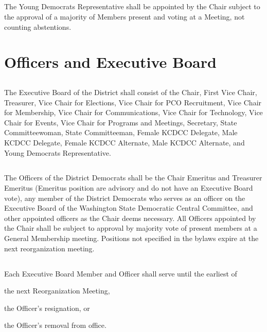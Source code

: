 \subsection{}
The Young Democrats Representative shall be appointed by the Chair subject to the approval of a majority of Members present and voting at a Meeting, not counting abstentions.

\section{Officers and Executive Board}
\subsection{} \label{exec-board}
The Executive Board of the \fortythird{} District  shall consist of the Chair, First Vice Chair, Treasurer, Vice Chair for Elections, Vice Chair for PCO Recruitment, Vice Chair for Membership, Vice Chair for Communications, Vice Chair for Technology, Vice Chair for Events, Vice Chair for Programs and Meetings, Secretary, State Committeewoman, State Committeeman, Female KCDCC Delegate, Male KCDCC Delegate, Female KCDCC Alternate, Male KCDCC Alternate, and Young Democrats Representative.

\subsection{} \label{officers}
The Officers of the \fortythird{} District Democrats shall be the Chair Emeritus and Treasurer Emeritus (Emeritus position are advisory and do not have an Executive Board vote), any member of the \fortythird{} District Democrats who serves as an officer on the Executive Board of the Washington State Democratic Central Committee, and other appointed officers as the Chair deems necessary. All Officers appointed by the Chair shall be subject to approval by majority vote of present members at a General Membership meeting. Positions not specified in the bylaws expire at the next reorganization meeting.

\subsection{}
Each Executive Board Member and Officer shall serve until the earliest of
\begin{inlinealphalist}
    \item the next Reorganization Meeting,
    \item the Officer’s resignation, or
    \item the Officer’s removal from office.
\end{inlinealphalist}

